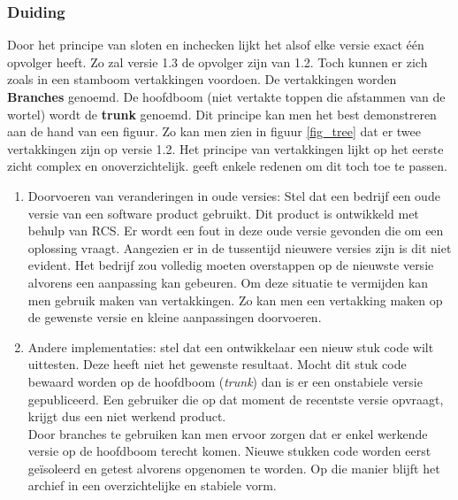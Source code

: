 \subsubsection{Duiding}
Door het principe van sloten en inchecken lijkt het alsof elke versie exact één opvolger heeft. Zo zal versie 1.3 de opvolger zijn van 1.2. Toch kunnen er zich zoals in een stamboom  vertakkingen voordoen. De vertakkingen worden \textbf{Branches} genoemd. De hoofdboom (niet vertakte toppen die afstammen van de wortel) wordt de \textbf{trunk} genoemd. Dit principe kan men het best demonstreren aan de hand van een figuur. Zo kan men zien in figuur \ref{fig_tree} dat er twee vertakkingen zijn op versie 1.2. Het principe van vertakkingen lijkt op het eerste zicht complex en onoverzichtelijk. \textcite{Tichy85rcs} geeft enkele redenen om dit toch toe te passen.

\begin{enumerate}
\item Doorvoeren van veranderingen in oude versies: Stel dat een bedrijf een oude versie van een software product gebruikt. Dit product is ontwikkeld met behulp van RCS. Er wordt een fout in deze oude versie gevonden die om een oplossing vraagt. Aangezien er in de tussentijd nieuwere versies zijn is dit niet evident. Het bedrijf zou volledig moeten overstappen op de nieuwste versie alvorens een aanpassing kan gebeuren. Om deze situatie te vermijden kan men gebruik maken van vertakkingen. Zo kan men een vertakking maken op de gewenste versie en kleine aanpassingen doorvoeren.\\
\item Andere implementaties: stel dat een ontwikkelaar een nieuw stuk code wilt uittesten. Deze heeft niet het gewenste resultaat. Mocht dit stuk code bewaard worden op de hoofdboom (\textit{trunk}) dan is er een onstabiele versie gepubliceerd. Een gebruiker die op dat moment de recentste versie opvraagt, krijgt dus een niet werkend product.\\
Door branches te gebruiken kan men ervoor zorgen dat er enkel werkende versie op de hoofdboom terecht komen. Nieuwe stukken code worden eerst geïsoleerd en getest alvorens opgenomen te worden. Op die manier blijft het archief in een overzichtelijke en stabiele vorm.
\end{enumerate}

